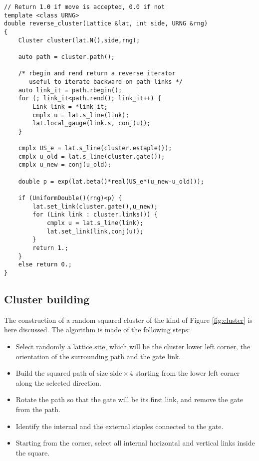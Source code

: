 \begin{lstlisting}[caption={Reverse cluster update}]
// Return 1.0 if move is accepted, 0.0 if not
template <class URNG>
double reverse_cluster(Lattice &lat, int side, URNG &rng)
{
    Cluster cluster(lat.N(),side,rng);

    auto path = cluster.path();

    /* rbegin and rend return a reverse iterator
       useful to iterate backward on path links */
    auto link_it = path.rbegin();
    for (; link_it<path.rend(); link_it++) {
        Link link = *link_it;
        cmplx u = lat.s_line(link);
        lat.local_gauge(link.s, conj(u));
    }

    cmplx US_e = lat.s_line(cluster.estaple());
    cmplx u_old = lat.s_line(cluster.gate());
    cmplx u_new = conj(u_old);

    double p = exp(lat.beta()*real(US_e*(u_new-u_old)));

    if (UniformDouble()(rng)<p) {
        lat.set_link(cluster.gate(),u_new);
        for (Link link : cluster.links()) {
            cmplx u = lat.s_line(link);
            lat.set_link(link,conj(u));
        }
        return 1.;
    }
    else return 0.;
}
\end{lstlisting}

\subsection*{Cluster building}

The construction of a random squared cluster of the kind of Figure \ref{fig:cluster} is here discussed.
The algorithm is made of the following steps:

\begin{itemize}
    \item
        Select randomly a lattice site, which will be the cluster lower left corner,
        the orientation of the surrounding path and the gate link.
    \item
        Build the squared path of size $\mathrm{side}\times 4$ starting from the lower left corner along the selected direction.
    \item
        Rotate the path so that the gate will be its first link,
        and remove the gate from the path.
    \item Identify the internal and the external staples connected to the gate.
    \item
        Starting from the corner, select all internal horizontal and vertical links inside the square.
\end{itemize}

